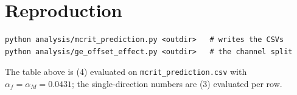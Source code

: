 \documentclass[10pt]{article}
\begin{document}
\section*{Reproduction}

\begin{verbatim}
python analysis/mcrit_prediction.py <outdir>   # writes the CSVs
python analysis/ge_offset_effect.py <outdir>   # the channel split
\end{verbatim}
The table above is (4) evaluated on \texttt{mcrit\_prediction.csv}
with $\alpha_f = \alpha_M = 0.0431$; the single-direction numbers
are (3) evaluated per row.
\end{document}
